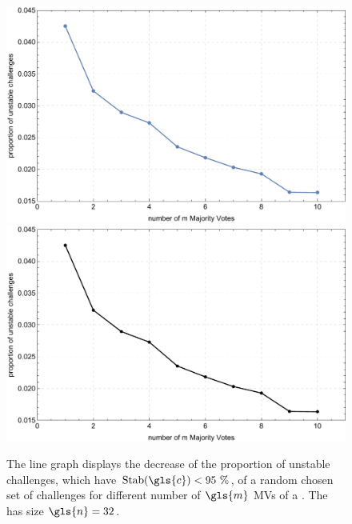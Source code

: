 \begin{figure}[ht]
\ifx{}\undefined
{}
\else
	\if{}
\centering
\includegraphics[width=1.00\textwidth]{images/single-votes-stab-simulation.pdf}
	\else
\includegraphics[width=1.00\textwidth]{images/single-votes-stab-simulation_mono.pdf}
    \fi
\fi
\caption[Decrease of unstable challenges of a \mpuf]{The line graph displays the decrease of the proportion of unstable challenges, which have $\Stab(\gls{c}) < 95\ \%$, of a random chosen set of challenges for different number of $\gls{m}$ \acp{MV} of a \mpuf.
The \mpuf has size $\gls{n} = 32$.
} %
\label{fig:majorityvotestabilityimprovement}
\end{figure}

